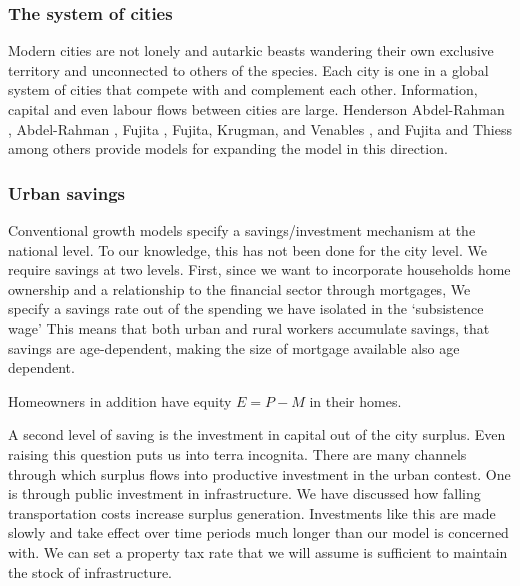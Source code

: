 \subsubsection{The system of cities}
Modern cities are not lonely and autarkic  beasts wandering their own exclusive territory and unconnected to others of the species. Each city is one in a global system of cities that compete with and complement each other. Information, capital and even labour flows between cities are large. Henderson Abdel-Rahman \cite{Henderson1972Sizes}, Abdel-Rahman \cite{abdel-rahmanAgglomerationEconomiesTypes1990}, Fujita \cite{fujitaMonopolisticCompetitionModel1988}, Fujita, Krugman, and Venables \cite{fujitaSpatialEconomyCities1999}, and Fujita and Thiess \cite{fujitaEconomicsAgglomeration1996} among others provide models for expanding the model in this direction.



\subsubsection{Urban savings}

Conventional growth models specify a savings/investment mechanism at the national level. To our knowledge, this has not been done for the city level. We require  savings at two levels. First, since we want to incorporate  households home ownership and a relationship to the financial sector through mortgages, We specify a savings rate out of the spending we have isolated in the `subsistence wage' This means that both urban and rural workers accumulate savings, that savings are age-dependent, making the size of mortgage available also age dependent. 

Homeowners in addition have equity $E=P-M$ in their homes. %

A second level of saving is the  investment in capital out of the city surplus. Even raising this question puts us into terra incognita. There are many  channels through which surplus flows into productive investment in the urban contest. One is through public investment in infrastructure. We have discussed how falling transportation costs increase surplus generation. Investments like this are made slowly and take effect over time periods much longer than our model is concerned with.  We can set a property tax rate   that we will assume is sufficient to maintain the stock of infrastructure.

